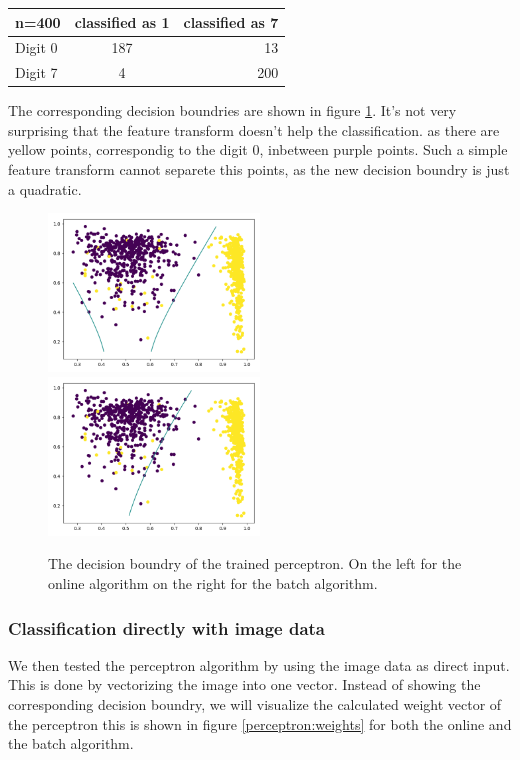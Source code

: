 \begin{tabular}{ l | c | r }
\centering
  n=400 & classified as 1 & classified as 7 \\ \hline
  Digit 0 & 187 & 13 \\
  Digit 7 & 4 & 200 \\
\end{tabular}

The corresponding decision boundries are shown in figure \ref{perceptron:decision:5d}. It's not very surprising that the feature transform doesn't help the classification. as there are yellow points, correspondig to the digit 0, inbetween purple points. Such a simple feature transform cannot separete this points, as the new decision boundry is just a quadratic.

\begin{figure}
\includegraphics[width = 0.5\textwidth]{figures/decision_5d_online}
\includegraphics[width = 0.5\textwidth]{figures/decision_5d_batch}
\caption{The decision boundry of the trained perceptron. On the left for the online algorithm on the right for the batch algorithm.}
\label{perceptron:decision:5d}
\end{figure}

\subsubsection{Classification directly with image data}
We then tested the perceptron algorithm by using the image data as direct input. This is done by vectorizing the image into one vector. Instead of showing the corresponding decision boundry, we will visualize the calculated weight vector of the perceptron this is shown in figure \ref{perceptron:weights} for both the online and the batch algorithm.

